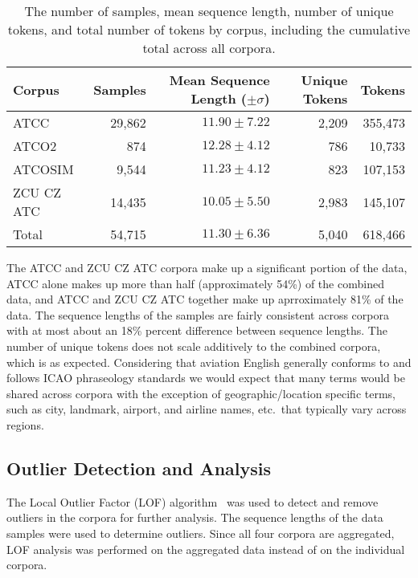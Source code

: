 \documentclass[12pt]{article}
\begin{document}
\begin{table}[h!]
    \centering
    \begin{tabular}{l r r r r}
        \toprule
        \textbf{Corpus} & \textbf{Samples} & \textbf{Mean Sequence Length (\(\pm \sigma\))} & \textbf{Unique Tokens} & \textbf{Tokens} \\
        \midrule
        ATCC            & 29,862           & \(11.90 \pm 7.22\)                             & 2,209                  & 355,473         \\
        ATCO2           & 874              & \(12.28 \pm 4.12\)                             & 786                    & 10,733          \\
        ATCOSIM         & 9,544            & \(11.23 \pm 4.12\)                             & 823                    & 107,153         \\
        ZCU CZ ATC      & 14,435           & \(10.05 \pm 5.50\)                             & 2,983                  & 145,107         \\
        \midrule
        Total           & 54,715           & \(11.30 \pm 6.36\)                             & 5,040                  & 618,466         \\
        \bottomrule
    \end{tabular}
    \label{table:corpora_stats}
    \caption{The number of samples, mean sequence length, number of unique tokens, and total number of tokens by corpus, including the cumulative
        total across all corpora.}
\end{table}

The ATCC and ZCU CZ ATC corpora make up a significant portion of the data, ATCC alone makes up more than half (approximately 54\%) of the combined
data, and ATCC and ZCU CZ ATC together make up aprroximately 81\% of the data. The sequence lengths of the samples are fairly consistent across
corpora with at most about an 18\% percent difference between sequence lengths. The number of unique tokens does not scale additively to the
combined corpora, which is as expected. Considering that aviation English generally conforms to and follows ICAO phraseology standards we would expect
that many terms would be shared across corpora with the exception of geographic/location specific terms, such as city, landmark, airport, and airline
names, etc.~that typically vary across regions.

\subsection{Outlier Detection and Analysis}\label{sec:outliers}
The Local Outlier Factor (LOF) algorithm~\cite{breunig_lof_2000} was used to detect and remove outliers in the corpora for further analysis. The
sequence lengths of the data samples were used to determine outliers. Since all four corpora are aggregated, LOF analysis was performed on the
aggregated data instead of on the individual corpora.
\end{document}
